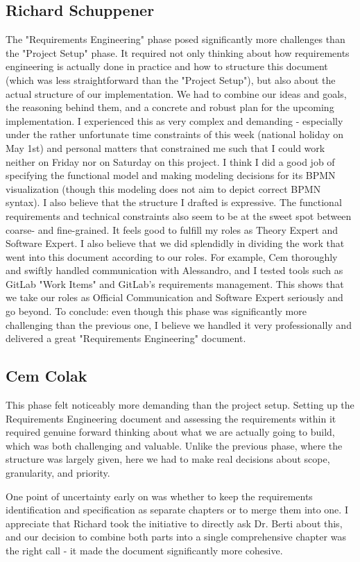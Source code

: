 \documentclass[12pt,a4paper]{article}
\begin{document}
\subsection{Richard Schuppener}
The "Requirements Engineering" phase posed significantly more challenges than the "Project Setup" phase. It required not only thinking about how requirements engineering is actually done in practice and how to structure this document (which was less straightforward than the "Project Setup"), but also about the actual structure of our implementation.
We had to combine our ideas and goals, the reasoning behind them, and a concrete and robust plan for the upcoming implementation. I experienced this as very complex and demanding - especially under the rather unfortunate time constraints of this week (national holiday on May 1st) and personal matters that constrained me such that I could work neither on Friday nor on Saturday on this project.  
I think I did a good job of specifying the functional model and making modeling decisions for its BPMN visualization (though this modeling does not aim to depict correct BPMN syntax). I also believe that the structure I drafted is expressive. The functional requirements and technical constraints also seem to be at the sweet spot between coarse- and fine-grained. It feels good to fulfill my roles as Theory Expert and Software Expert.
I also believe that we did splendidly in dividing the work that went into this document according to our roles. For example, Cem thoroughly and swiftly handled communication with Alessandro, and I tested tools such as GitLab "Work Items" and GitLab's requirements management.
This shows that we take our roles as Official Communication and Software Expert seriously and go beyond.
To conclude: even though this phase was significantly more challenging than the previous one, I believe we handled it very professionally and delivered a great "Requirements Engineering" document.
\subsection{Cem Colak}
This phase felt noticeably more demanding than the project setup. Setting up the Requirements Engineering document and assessing the requirements within it required genuine forward thinking about what we are actually going to build, which was both challenging and valuable. Unlike the previous phase, where the structure was largely given, here we had to make real decisions about scope, granularity, and priority.

One point of uncertainty early on was whether to keep the requirements identification and specification as separate chapters or to merge them into one. I appreciate that Richard took the initiative to directly ask Dr. Berti about this, and our decision to combine both parts into a single comprehensive chapter was the right call - it made the document significantly more cohesive.
\end{document}
